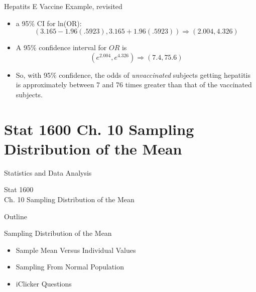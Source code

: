 \documentclass[14pt]{beamer}\usepackage[]{graphicx}\usepackage[]{color}
\begin{document}
\begin{frame}[fragile]{Hepatits E Vaccine Example, revisited}

{\small{
  \begin{itemize}

  \item<1-> a 95\% CI for ln(OR):
    {\footnotesize{
    \begin{equation*}
      (3.165 - 1.96(.5923), 3.165 + 1.96(.5923)) \Rightarrow ( 2.004, 4.326)
    \end{equation*}
    }}

  \item<2-> A 95\% confidence interval for $OR$ is
  {\small{
  \begin{equation*}
    (e^{2.004}, e^{4.326} ) \Rightarrow (7.4, 75.6)
  \end{equation*}
  }}

  \item<3-> So, with 95\% confidence, the odds of \textit{unvaccinated} subjects getting hepatitis is approximately between 7 and 76 times greater than that of the vaccinated subjects.

\end{itemize}
}}
\end{frame}



\section{Stat 1600 Ch. 10 Sampling Distribution of the Mean}

\begin{frame}[fragile]{Statistics and Data Analysis}

Stat 1600 \\ Ch. 10 Sampling Distribution of the Mean

\end{frame}

\begin{frame}[fragile]{Outline}

Sampling Distribution of the Mean  

\begin{itemize}
\item Sample Mean Versus Individual Values  
\item Sampling From Normal Population  
\item iClicker Questions
\end{itemize}
\end{frame}
\end{document}

